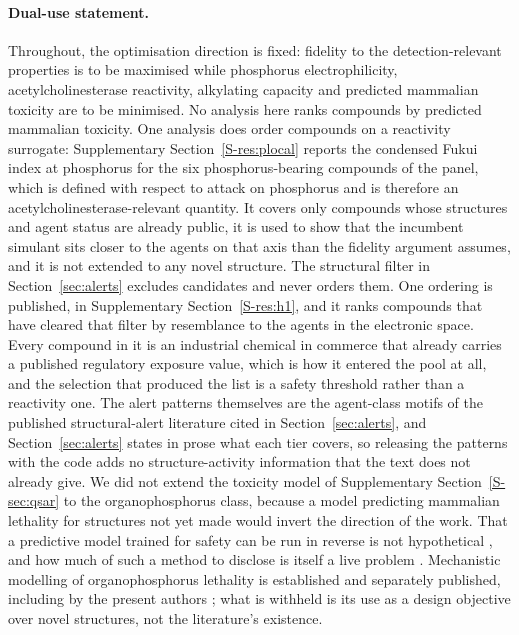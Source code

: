 \documentclass[1p,times]{elsarticle}
\begin{document}
\paragraph{Dual-use statement.} Throughout, the optimisation direction is fixed:
fidelity to the detection-relevant properties is to be maximised while
phosphorus electrophilicity, acetylcholinesterase reactivity, alkylating
capacity and predicted mammalian toxicity are to be minimised. No analysis here
ranks compounds by predicted mammalian toxicity. One analysis does order
compounds on a reactivity surrogate: Supplementary Section~\ref{S-res:plocal}
reports the condensed Fukui index at phosphorus for the six phosphorus-bearing
compounds of the panel, which is defined with respect to attack on phosphorus
and is therefore an acetylcholinesterase-relevant quantity. It covers only
compounds whose structures and agent status are already public, it is used to
show that the incumbent simulant sits closer to the agents on that axis than the
fidelity argument assumes, and it is not extended to any novel structure. The
structural filter in Section~\ref{sec:alerts} excludes candidates and never
orders them. One ordering is published, in
Supplementary Section~\ref{S-res:h1}, and it ranks compounds that have cleared
that filter by resemblance to the agents in the electronic space. Every
compound in it is an industrial chemical in commerce that already carries a
published regulatory exposure value, which is how it entered the pool at all,
and the selection that produced the list is a safety threshold rather than a
reactivity one. The alert patterns themselves are the agent-class motifs of the
published structural-alert literature cited in Section~\ref{sec:alerts}, and
Section~\ref{sec:alerts} states in prose what each tier covers, so releasing the
patterns with the code adds no structure-activity information that the text does
not already give. We did not extend the toxicity
model of Supplementary Section~\ref{S-sec:qsar} to the organophosphorus class,
because a model predicting mammalian lethality for structures not yet made would
invert the direction of the work. That a predictive model trained for safety can
be run in reverse is not hypothetical \cite{urbina2022}, and how much of such a
method to disclose is itself a live problem \cite{cbrndisclose}. Mechanistic
modelling of organophosphorus lethality is established and separately published,
including by the present authors \cite{qsarld50}; what is withheld is its use as
a design objective over novel structures, not the literature's existence.
\end{document}

